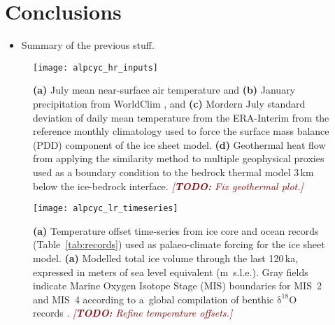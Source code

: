 \documentclass{article}
\newcommand{\todo}[1]{\textcolor{darkred}{\emph{[\textbf{TODO:} #1]}}}
\newcommand{\chem}[1]{\ensuremath{\mathrm{#1}}}
\begin{document}
\section{Conclusions}

    \begin{itemize}
    \item Summary of the previous stuff.
    \end{itemize}







\clearpage

    \begin{figure}
      \centerline{\texttt{[image: alpcyc\_hr\_inputs]}}
      \caption{%
        \textbf{(a)} July mean near-surface air temperature and
        \textbf{(b)} January precipitation from WorldClim
        \citep[1960--1990]{Hijmans.etal.2005}, and
        \textbf{(c)} Mordern July standard deviation of daily mean temperature
        from the ERA-Interim \citep[1979--2012]{Dee.etal.2011} from the
        reference monthly climatology used to force the surface mass balance
        (PDD) component of the ice sheet model.
        \textbf{(d)} Geothermal heat flow from applying the similarity method
        to multiple geophysical proxies \citep{Goutorbe.etal.2011} used as a
        boundary condition to the bedrock thermal model 3\,km below the
        ice-bedrock interface.
        \todo{Fix geothermal plot.}}
      \label{fig:inputs}
    \end{figure}

    \begin{figure}
      \centerline{\texttt{[image: alpcyc\_lr\_timeseries]}}
      \caption{%
        \textbf{(a)} Temperature offset time-series from ice core and ocean
        records (Table~\ref{tab:records}) used as palaeo-climate forcing for
        the ice sheet model.
        \textbf{(a)} Modelled total ice volume through the last 120\,ka,
        expressed in meters of sea level equivalent (m~s.l.e.). Gray fields
        indicate Marine Oxygen Isotope Stage (MIS) boundaries for MIS~2 and
        MIS~4 according to a~global compilation of benthic \chem{\delta^{18}O}
        records \citep{Lisiecki.Raymo.2005}.
        \todo{Refine temperature offsets.}}
      \label{fig:timeseries}
    \end{figure}
\end{document}
